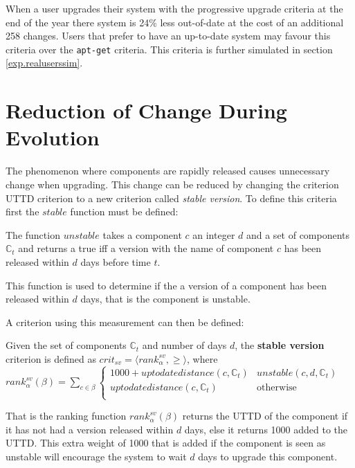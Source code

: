 When a user upgrades their system with the progressive upgrade criteria at the end of the year there system is 24\% less out-of-date at the cost of an additional 258 changes.
Users that prefer to have an up-to-date system may favour this criteria over the \texttt{apt-get} criteria. 
This criteria is further simulated in section \ref{exp.realuserssim}.

\section{Reduction of Change During Evolution}
\label{exp.stable}
The phenomenon where components are rapidly released causes unnecessary change when upgrading.
This change can be reduced by changing the criterion UTTD criterion to a new criterion called \textit{stable version}.
To define this criteria first the $stable$ function must be defined:
\begin{defs}
The function $unstable$ takes a component $c$ an integer $d$ and a set of components $\mathbb{C}_t$ and returns a true 
iff a version with the name of component $c$ has been released within $d$ days before time $t$.
\end{defs}
This function is used to determine if the a version of a component has been released within $d$ days, that is the component is unstable. 

A criterion using this measurement can then be defined:
\begin{defs}
	Given the set of components $\mathbb{C}_t$ and number of days $d$, the \textbf{stable version} criterion is defined as $crit_{sv} = \langle rank^{sv}_{\alpha}, \geq \rangle$,
	where \\$rank^{sv}_{\alpha}(\beta) = \sum_{c \in \beta} \begin{cases} 1000 + uptodatedistance(c,\mathbb{C}_t)& unstable(c,d,\mathbb{C}_t) \\ uptodatedistance(c,\mathbb{C}_t) & \text{otherwise} \\  \end{cases}$
\end{defs}
That is the ranking function $rank^{sv}_{\alpha}(\beta)$ returns the UTTD of the component if it has not had a version released within $d$ days,
else it returns 1000 added to the UTTD.
This extra weight of 1000 that is added if the component is seen as unstable will encourage the system to wait $d$ days to upgrade this component.

